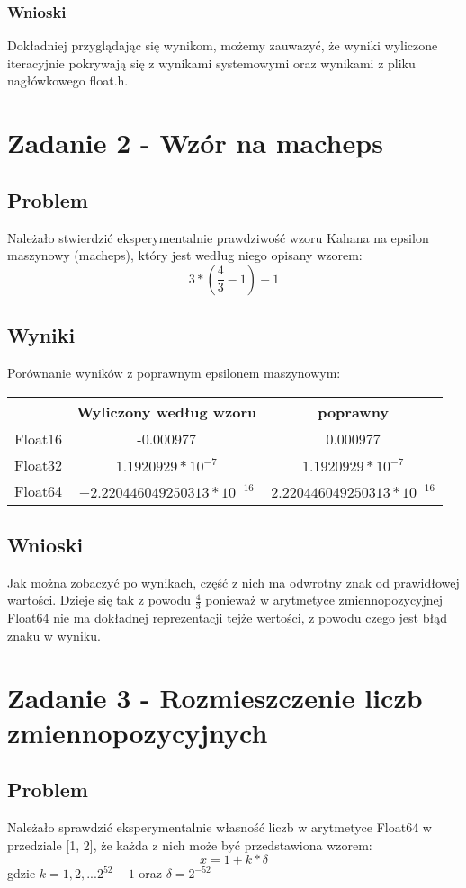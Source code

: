 \documentclass[12pt, a4paper]{article}
\begin{document}
\subsubsection{Wnioski}
Dokładniej przyglądając się wynikom, możemy zauwazyć, że wyniki wyliczone iteracyjnie pokrywają się z wynikami systemowymi oraz wynikami z pliku nagłówkowego float.h.


\section{Zadanie 2 - Wzór na macheps}
\subsection{Problem}
Należało stwierdzić eksperymentalnie prawdziwość wzoru Kahana na epsilon maszynowy (macheps), który jest według niego opisany wzorem:
\[3*(\frac{4}{3} - 1) - 1\]
\subsection{Wyniki}
Porównanie wyników z poprawnym epsilonem maszynowym:
\begin{center}
\begin{tabular}{ c|c|c}
  & Wyliczony według wzoru & poprawny\\
  \hline
 Float16 & -0.000977 & 0.000977\\
 Float32 & $1.1920929 * 10^{-7}$ & $1.1920929 * 10^{-7}$\\
 Float64 & $-2.220446049250313 * 10^{-16}$ & $2.220446049250313 * 10^{-16}$
\end{tabular}
\end{center}
\subsection{Wnioski}
Jak można zobaczyć po wynikach, część z nich ma odwrotny znak od prawidłowej wartości. Dzieje się tak z powodu $\frac{4}{3}$ ponieważ w arytmetyce zmiennopozycyjnej Float64 nie ma dokładnej reprezentacji tejże wertości, z powodu czego jest błąd znaku w wyniku.

\section{Zadanie 3 - Rozmieszczenie liczb zmiennopozycyjnych}
\subsection{Problem}
Należało sprawdzić eksperymentalnie własność liczb w arytmetyce Float64 w przedziale [1, 2], że każda z nich może być przedstawiona wzorem:
\[x =1 + k * \delta \] gdzie $k = 1, 2, ... 2^{52}-1$ oraz $\delta = 2^{-52}$
\end{document}
